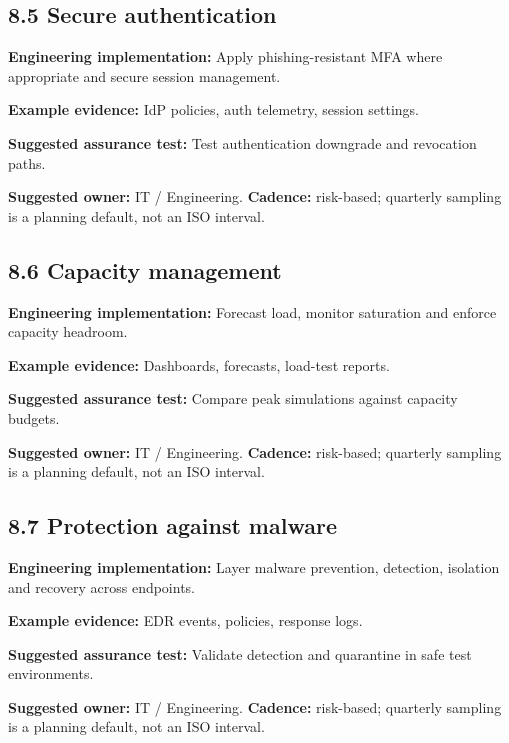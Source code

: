 \documentclass[11pt,letterpaper]{article}
\begin{document}
\subsection{8.5 Secure authentication}
\textbf{Engineering implementation:} Apply phishing-resistant MFA where appropriate and secure session management.\par
\textbf{Example evidence:} IdP policies, auth telemetry, session settings.\par
\textbf{Suggested assurance test:} Test authentication downgrade and revocation paths.\par
\textbf{Suggested owner:} IT / Engineering. \textbf{Cadence:} risk-based; quarterly sampling is a planning default, not an ISO interval.\par
{}
\subsection{8.6 Capacity management}
\textbf{Engineering implementation:} Forecast load, monitor saturation and enforce capacity headroom.\par
\textbf{Example evidence:} Dashboards, forecasts, load-test reports.\par
\textbf{Suggested assurance test:} Compare peak simulations against capacity budgets.\par
\textbf{Suggested owner:} IT / Engineering. \textbf{Cadence:} risk-based; quarterly sampling is a planning default, not an ISO interval.\par
{}
\subsection{8.7 Protection against malware}
\textbf{Engineering implementation:} Layer malware prevention, detection, isolation and recovery across endpoints.\par
\textbf{Example evidence:} EDR events, policies, response logs.\par
\textbf{Suggested assurance test:} Validate detection and quarantine in safe test environments.\par
\textbf{Suggested owner:} IT / Engineering. \textbf{Cadence:} risk-based; quarterly sampling is a planning default, not an ISO interval.\par
{}
\end{document}
